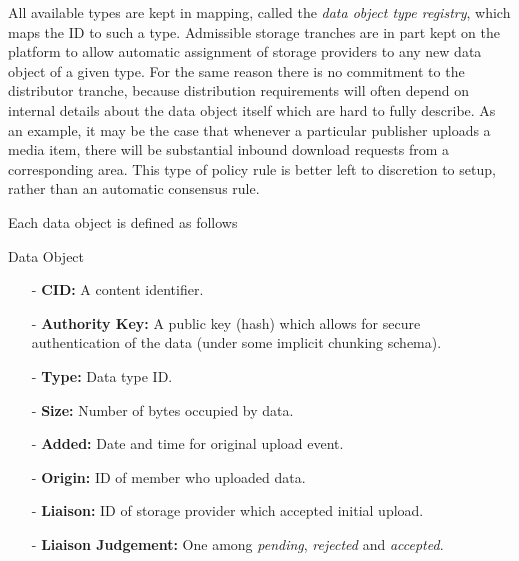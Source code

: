 \documentclass{article}
\newenvironment{concept_box}[1]
    {
    \begin{tcolorbox}
    {\large \textbf{#1} }
    }
    {
    \end{tcolorbox}
    }
\begin{document}
All available types are kept in mapping, called the \textit{data object type registry}, which maps the ID to such a type. Admissible storage tranches are in part kept on the platform to allow automatic assignment of storage providers to any new data object of a given type. For the same reason there is no commitment to the distributor tranche, because distribution requirements will often depend on internal details about the data object itself which are hard to fully describe. As an example, it may be the case that whenever a particular publisher uploads a media item, there will be substantial inbound download requests from a corresponding area. This type of policy rule is better left to discretion to setup, rather than an automatic consensus rule.

Each data object is defined as follows\\

\begin{concept_box}{Data Object}
\begin{itemize}

  \item[-] \textbf{CID:} A content identifier.

  \item[-] \textbf{Authority Key:} A public key (hash) which allows for secure authentication of the data (under some implicit chunking schema).

  \item[-] \textbf{Type:} Data type ID.


  \item[-] \textbf{Size:} Number of bytes occupied by data.

  \item[-] \textbf{Added:} Date and time for original upload event.

  \item[-] \textbf{Origin:} ID of member who uploaded data.

  \item[-] \textbf{Liaison:} ID of storage provider which accepted initial upload.

  \item[-] \textbf{Liaison Judgement:} One among \textit{pending}, \textit{rejected} and \textit{accepted}.

\end{itemize}

\end{concept_box}
\end{document}

